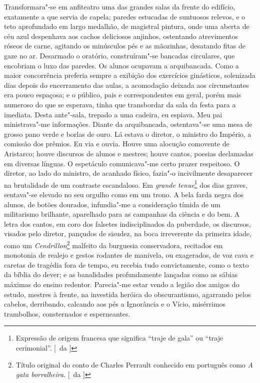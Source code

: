 Transformara"-se em anfiteatro uma das
grandes salas da frente do edifício, exatamente a que servia de capela;
paredes estucadas de suntuosos relevos, e o teto aprofundado em largo
medalhão, de magistral pintura, onde uma aberta de céu azul despenhava
aos cachos deliciosos anjinhos, ostentando atrevimentos róseos de
carne, agitando os minúsculos pés e as mãozinhas, desatando fitas de
gaze no ar. Desarmado o oratório, construíram"-se bancadas circulares,
que encobriam o luxo das paredes. Os alunos ocupavam a arquibancada.
Como a maior concorrência preferia sempre a exibição dos exercícios
ginásticos, solenizada dias depois do encerramento das aulas, a
acomodação deixada aos circunstantes era pouco espaçosa; e o público,
pais e correspondentes em geral, porém mais numeroso do que se
esperava, tinha que transbordar da sala da festa para a imediata. Desta
ante"-sala, trepado a uma cadeira, eu espiava. Meu pai ministrava"-me
informações. Diante da arquibancada, ostentava"-se uma mesa de grosso
pano verde e borlas de ouro. Lá estava o diretor, o ministro do
Império, a comissão dos prêmios. Eu via e ouvia. Houve uma alocução
comovente de Aristarco; houve discursos de alunos e mestres; houve
cantos, poesias declamadas em diversas línguas. O espetáculo
comunicava"-me certo prazer respeitoso. O diretor, ao lado do
ministro, de acanhado físico, fazia"-o incivilmente desaparecer na
brutalidade de um contraste escandaloso. Em \textit{grande tenue}\footnote{ Expressão 
de origem francesa que significa ``traje de gala'' ou ``traje cerimonial''. [~da ]} 
dos dias graves, sentava"-se elevado no seu orgulho como em um trono. A bela
farda negra dos alunos, de botões dourados, infundia"-me a
consideração tímida de um militarismo brilhante, aparelhado para as
campanhas da ciência e do bem. A letra dos cantos, em coro dos falsetes
indisciplinados da puberdade, os discursos, visados pelo diretor,
pançudos de sisudez, na boca irreverente da primeira idade, como um
\textit{Cendrillon}\footnote{ Título original do conto de Charles Perrault 
conhecido em português como \textit{A gata borralheira}. [~da ]} 
malfeito da burguesia conservadora, recitados em monotonia
de realejo e gestos rodantes de manivela, ou exagerados, de voz cava e
caretas de tragédia fora de tempo, eu recebia tudo convictamente, como
o texto da bíblia do dever; e as banalidades profundamente lançadas
como as sábias máximas do ensino redentor. Parecia"-me estar vendo a
legião dos amigos do estudo, mestres à frente, na investida heróica do
obscurantismo, agarrando pelos cabelos, derribando, calcando aos pés a
Ignorância e o Vício, misérrimos trambolhos, consternados e esperneantes. 

